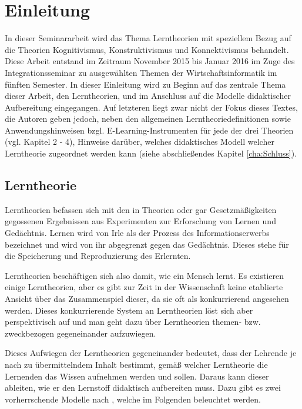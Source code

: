 \chapter{Einleitung}
\label{cha:Einleitung}
In dieser Seminararbeit wird das Thema Lerntheorien mit speziellem Bezug auf die Theorien Kognitivismus, Konstruktivismus und Konnektivismus behandelt. Diese Arbeit entstand im Zeitraum November 2015 bis Januar 2016 im Zuge des Integrationsseminar zu ausgewählten Themen der Wirtschaftsinformatik im fünften Semester. In dieser Einleitung wird zu Beginn auf das zentrale Thema dieser Arbeit, den Lerntheorien, und im Anschluss auf die Modelle didaktischer Aufbereitung eingegangen. Auf letzteren liegt zwar nicht der Fokus dieses Textes, die Autoren geben jedoch, neben den allgemeinen Lerntheoriedefinitionen sowie Anwendungshinweisen bzgl. E-Learning-Instrumenten für jede der drei Theorien (vgl. Kapitel 2 - 4), Hinweise darüber, welches didaktisches Modell welcher Lerntheorie zugeordnet werden kann (siehe abschließendes Kapitel \ref{cha:Schluss}). 

\section{Lerntheorie}
\label{sec:Lerntheorie}
Lerntheorien befassen sich mit den in Theorien oder gar Gesetzmäßigkeiten gegossenen Ergebnissen aus Experimenten zur Erforschung von Lernen und Gedächtnis. Lernen wird von Irle als der Prozess des Informationserwerbs bezeichnet und wird von ihr abgegrenzt gegen das Gedächtnis. Dieses stehe für die Speicherung und Reproduzierung des Erlernten. \cite{Irle.1986}

Lerntheorien beschäftigen sich also damit, wie ein Mensch lernt. \cite{Reinmann.2013} Es existieren einige Lerntheorien, aber es gibt zur Zeit in der Wissenschaft keine etablierte Ansicht über das Zusammenspiel dieser, da sie oft als konkurrierend angesehen werden. \cite[S. 172 f.]{Weinert.1996} Dieses konkurrierende System an Lerntheorien löst sich aber perspektivisch auf \cite{WittKerres.2002} und man geht dazu über Lerntheorien themen- bzw. zweckbezogen gegeneinander aufzuwiegen. \cite{Reinmann.2013}

Dieses Aufwiegen der Lerntheorien gegeneinander bedeutet, dass der Lehrende je nach zu übermittelndem Inhalt bestimmt, gemäß welcher Lerntheorie die Lernenden das Wissen aufnehmen werden und sollen. Daraus kann dieser ableiten, wie er den Lernstoff didaktisch aufbereiten muss. Dazu gibt es zwei vorherrschende Modelle nach \cite{Kerres.2001}, welche im Folgenden beleuchtet werden. 

